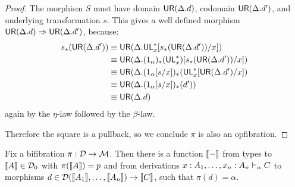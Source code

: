\begin{proof}
The morphism $S$ must have domain $\mathsf{UR}(\Delta.d)$, codomain $\mathsf{UR}(\Delta.d')$, and underlying transformation $s$. This gives a well defined morphism $\mathsf{UR}(\Delta.d) \Rightarrow \mathsf{UR}(\Delta.d')$, because:
\begin{align*}
s_*(\mathsf{UR}(\Delta.d')) 
&\equiv \mathsf{UR}(\Delta.\mathsf{UL}^*_{x}[s_*(\mathsf{UR}(\Delta.d'))/x])\\
&\equiv \mathsf{UR}(\Delta.(1_\alpha)_*(\mathsf{UL}^*_{x})[s_*(\mathsf{UR}(\Delta.d'))/x])\\
&\equiv \mathsf{UR}(\Delta.(1_\alpha[s/x])_*(\mathsf{UL}^*_{x}[\mathsf{UR}(\Delta.d')/x])\\
&\equiv \mathsf{UR}(\Delta.(1_\alpha[s/x])_*(d'))\\
&\equiv \mathsf{UR}(\Delta.d)
\end{align*}
again by the $\eta$-law followed by the $\beta$-law.

Therefore the square is a pullback, so we conclude $\pi$ is also an opfibration.
\end{proof}

\begin{theorem}
Fix a bifibration $\pi : \mathcal{D} \to \mathcal{M}$.  Then there is a function $\llbracket -
\rrbracket$ from types  to $\llbracket A \rrbracket \in \mathcal{D}_0$ with $\pi(\llbracket
A \rrbracket) = p$ and from derivations $x:A_1, \ldots,
  x_n:A_n \vdash_{\alpha} C$ to morphisms $d \in \mathcal{D}(\llbracket A_1 \rrbracket, \dots, \llbracket
A_n \rrbracket) \to \llbracket C \rrbracket$, such that $\pi(d) = \alpha$.
\end{theorem}


